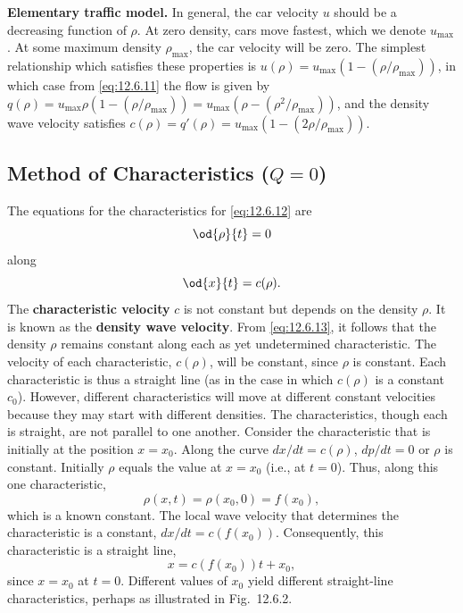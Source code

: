 \textbf{Elementary traffic model.}  In general, the car velocity $u$ should be a decreasing function of $\rho$.  At zero density, cars move fastest, which we denote $u_{\max}$.  At some maximum density $\rho_{\max}$, the car velocity will be zero.  The simplest relationship which satisfies these properties is $u(\rho) = u_{\max}(1 - (\rho/\rho_{\max}))$, in which case from \eqref{eq:12.6.11} the flow is given by $q(\rho) = u_{\max}\rho(1 - (\rho/\rho_{\max})) = u_{\max}(\rho - (\rho^2/\rho_{\max}))$, and the density wave velocity satisfies $c(\rho) = q'(\rho) = u_{\max}(1 - (2\rho/\rho_{\max}))$.

\subsection{Method of Characteristics ($Q = 0$)}
\label{sec:char-Q-zero}

The equations for the characteristics for \eqref{eq:12.6.12} are
\begin{equation}
\label{eq:12.6.13}
\od{\rho}{t} = 0
\end{equation}
along
\begin{equation}
\label{eq:12.6.14}
\od{x}{t} = c(\rho).
\end{equation}
The \textbf{characteristic velocity} $c$ is not constant but depends on the density $\rho$.  It is known as the \textbf{density wave velocity}.  From \eqref{eq:12.6.13}, it follows that the density $\rho$ remains constant along each as yet undetermined characteristic.  The velocity of each characteristic, $c(\rho)$, will be constant, since $\rho$ is constant.  Each characteristic is thus a straight line (as in the case in which $c(\rho)$ is a constant $c_0$).  However, different characteristics will move at different constant velocities because they may start with different densities.  The characteristics, though each is straight, are not parallel to one another.  Consider the characteristic that is initially at the position $x = x_0$.  Along the curve $dx/dt = c(\rho)$, $dp/dt = 0$ or $\rho$ is constant.  Initially $\rho$ equals the value at $x = x_0$ (i.e., at $t = 0$).  Thus, along this one characteristic,
\begin{equation}
\label{eq:12.6.15}
\rho(x,t) = \rho(x_0,0) = f(x_0),
\end{equation}
which is a known constant.  The local wave velocity that determines the characteristic is a constant, $dx/dt = c(f(x_0))$.  Consequently, this characteristic is a straight line,
\begin{equation}
\label{eq:12.6.16}
x = c(f(x_0))t + x_0,
\end{equation}
since $x = x_0$ at $t = 0$.  Different values of $x_0$ yield different straight-line characteristics, perhaps as illustrated in Fig.~12.6.2.

